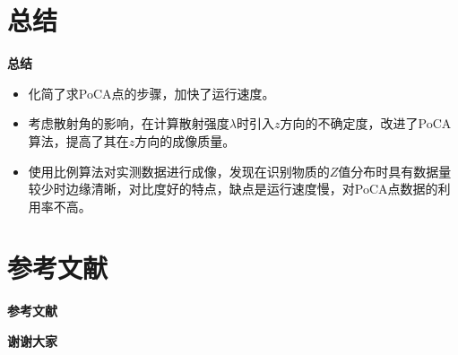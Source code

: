 \documentclass[10pt]{beamer}
\begin{document}
\section{总结}

\begin{frame}{\textbf{总结}}
    \begin{itemize}
        \item 化简了求PoCA点的步骤，加快了运行速度。
        \item 考虑散射角的影响，在计算散射强度$\lambda$时引入$z$方向的不确定度，改进了PoCA算法，提高了其在$z$方向的成像质量。
        \item 使用比例算法对实测数据进行成像，发现在识别物质的$Z$值分布时具有数据量较少时边缘清晰，对比度好的特点，缺点是运行速度慢，对PoCA点数据的利用率不高。
    \end{itemize}
\end{frame}

\section{参考文献}

\begin{frame}{\textbf{参考文献}}
    \printbibliography
\end{frame}

\begin{frame}[plain]
    \begin{center}
        \Huge
        \textbf{谢谢大家}
    \end{center}
\end{frame}
\end{document}
